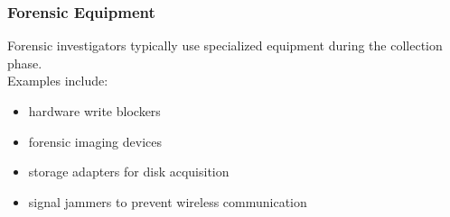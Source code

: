 \subsubsection*{Forensic Equipment}

Forensic investigators typically use specialized equipment during the collection phase.\\
Examples include:

\begin{itemize}
\item hardware write blockers
\item forensic imaging devices
\item storage adapters for disk acquisition
\item signal jammers to prevent wireless communication
\end{itemize}
